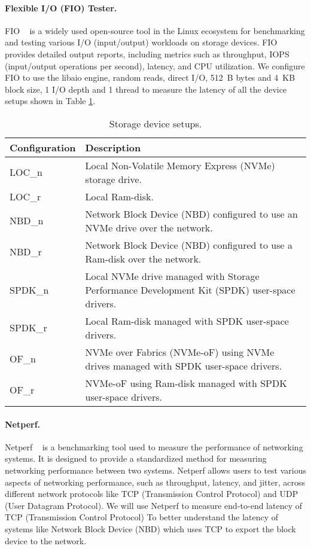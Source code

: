 \paragraph{Flexible I/O (FIO) Tester.}
FIO ~\cite{fio} is a widely used open-source tool in the Linux ecosystem for benchmarking
and testing various I/O (input/output) workloads on storage devices. FIO
provides detailed output reports, including metrics such as throughput, IOPS (input/output operations per second), latency, and CPU utilization. We configure FIO to use the
libaio engine, random reads, direct I/O, \SI{512}{B} bytes and \SI{4}{KB} block size, 1 I/O
depth and 1 thread to measure the latency of all the device setups shown in Table
\ref{tab:storage_configurations}. 

\begin{table}[h!]
\centering
\begin{tabular}{|>{\centering\arraybackslash}m{3cm}|>{\RaggedRight\arraybackslash}m{5cm}|}
\hline
\textbf{Configuration} & \textbf{Description} \\
\hline
LOC\_n & Local Non-Volatile Memory Express (NVMe) storage drive. \\
\hline
LOC\_r & Local Ram-disk. \\
\hline
NBD\_n & Network Block Device (NBD) configured to use an NVMe drive over the network. \\
\hline
NBD\_r & Network Block Device (NBD) configured to use a Ram-disk over the network. \\
\hline
SPDK\_n & Local NVMe drive managed with Storage Performance Development Kit (SPDK) user-space drivers. \\
\hline
SPDK\_r & Local Ram-disk managed with SPDK user-space drivers. \\
\hline
OF\_n & NVMe over Fabrics (NVMe-oF) using NVMe drives managed with SPDK user-space drivers. \\
\hline
OF\_r & NVMe-oF using Ram-disk managed with SPDK user-space drivers. \\
\hline
\end{tabular}
\caption{Storage device setups.}
\label{tab:storage_configurations}
\end{table}





\paragraph{Netperf.} 
Netperf ~\cite{netperf} is a benchmarking tool used to measure the performance of networking
systems. It is designed to provide a standardized method for measuring networking
performance between two systems. Netperf allows users to test various aspects of
networking performance, such as throughput, latency, and jitter, across
different network protocols like TCP (Transmission Control Protocol) and UDP
(User Datagram Protocol). We will use Netperf to measure end-to-end latency of
TCP (Transmission Control Protocol) To better understand the latency of systems
like Network Block Device (NBD) which uses TCP to export the block device to the
network.

